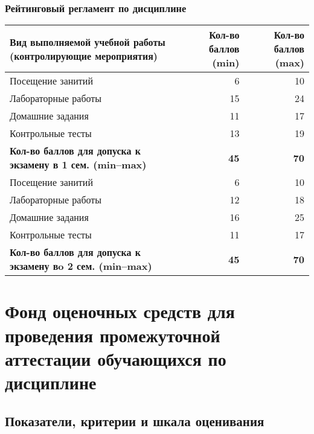 \documentclass[a4paper,12pt]{article}
\begin{document}
\subsubsection*{Рейтинговый регламент по дисциплине}
\begin{longtable}{|>{\raggedright\arraybackslash}p{114mm}|r|r|}
\hline
\centering\arraybackslash Вид выполняемой учебной работы (контролирующие мероприятия) & 
\multicolumn{1}{p{19mm}|}{\centering\arraybackslash{}Кол-во баллов (min)} & 
\multicolumn{1}{p{19mm}|}{\centering\arraybackslash{}Кол-во баллов (max)} \\
\hline
Посещение занитий   & 6  & 10 \\ 
\hline
Лабораторные работы & 15 & 24 \\ 
\hline
Домашние задания    & 11 & 17 \\ 
\hline
Контрольные тесты   & 13 & 19 \\ 
\hline
\bf Кол-во баллов для допуска к экзамену в 1 сем. (min--max) & \bf 45 & \bf 70 \\ 
\hline
Посещение занитий   & 6  & 10 \\ 
\hline
Лабораторные работы & 12 & 18 \\ 
\hline
Домашние задания    & 16 & 25 \\ 
\hline
Контрольные тесты   & 11 & 17 \\ 
\hline
\bf Кол-во баллов для допуска к экзамену вo 2 сем. (min--max) & \bf 45 & \bf 70 \\ 

\hline
\end{longtable}

\section{Фонд оценочных средств для проведения промежуточной аттестации обучающихся по дисциплине}

\subsection{Показатели, критерии и шкала оценивания}
\end{document}
